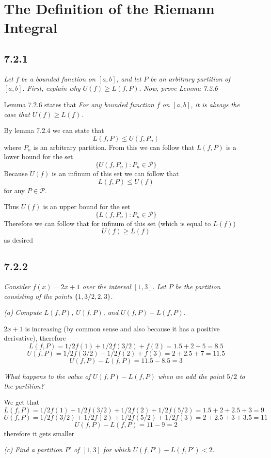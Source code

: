 \documentclass[11pt,oneside,titlepage]{book}
\begin{document}
\section{The Definition of the Riemann Integral}

\subsection*{7.2.1}
\textit{Let $f$ be a bounded function on $[a, b]$, and let $P$ be an arbitrary
  partition of $[a, b]$. First, explain why $U(f) \geq L(f, P)$. Now, prove
  Lemma 7.2.6}

Lemma 7.2.6 states that
\textit{For any bounded function $f$ on $[a, b]$, it is always the case that
$U(f) \geq L(f)$.}

By lemma 7.2.4 we can state that
$$L(f, P) \leq U(f, P_n)$$
where $P_n$ is an arbitrary partition. From this we can follow that
$L(f, P)$ is a lower bound for the set
$$\{U(f, P_n): P_n \in \mathcal{P} \}$$
Because $U(f)$ is an infinum of this set we can follow that
$$L(f, P) \leq U(f)$$
for any $P \in \mathcal{P}$. 

Thus $U(f)$ is an upper bound for the set 
$$\{L(f, P_n): P_n \in \mathcal{P} \}$$
Therefore we can follow that for  infinum of this
set (which is equal to $L(f)$)
$$U(f) \geq L(f)$$
as desired

\subsection*{7.2.2}
\textit{Consider $f(x) = 2x + 1$ over the interval $[1, 3]$. Let $P$ be the
  partition consisting of the points $\{1, 3/2, 2, 3\}$.}

\textit{(a) Compute $L(f, P)$, $U(f, P)$, and $U(f, P) - L(f, P)$.}

$2x + 1$ is increasing (by common sense and also because
it has a positive derivative), therefore
$$L(f, P) = 1/2 f(1) + 1/2 f(3/2) + f(2) = 1.5 + 2 + 5 = 8.5$$
$$U(f, P) = 1/2 f(3/2) + 1/2 f(2) + f(3) = 2 + 2.5 + 7 = 11.5$$
$$U(f, P) - L(f, P) = 11.5 - 8.5 = 3$$

\textit{What happens to the value of $U(f, P) - L(f, P)$ when we add the point
  $5/2$ to the partition?}

We get that
$$L(f, P) = 1/2 f(1) + 1/2 f(3/2) + 1/2 f(2) + 1/2 f(5/2) =
1.5 + 2 + 2.5 + 3 = 9$$
$$U(f, P) = 1/2 f(3/2) + 1/2 f(2) + 1/2 f(5/2) + 1/2 f(3) =
2 + 2.5 + 3 + 3.5 = 11$$
$$U(f, P) - L(f, P) = 11 - 9 = 2$$
therefore it gets smaller

\textit{(c) Find a partition $P'$ of $[1, 3]$ for which
  $U(f, P') - L(f, P') < 2$.}
\end{document}
